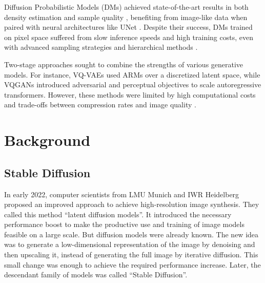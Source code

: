 \documentclass[11pt]{article}
\begin{document}
Diffusion Probabilistic Models (DMs) \cite{sohldickstein2015deepunsupervisedlearningusing} achieved state-of-the-art results in both density estimation \cite{kingma2023variationaldiffusionmodels} and sample quality \cite{dhariwal2021diffusionmodelsbeatgans}, benefiting from image-like data when paired with neural architectures like UNet \cite{dhariwal2021diffusionmodelsbeatgans, ronneberger2015unetconvolutionalnetworksbiomedical, DBLP:journals/corr/abs-2011-13456}. Despite their success, DMs trained on pixel space suffered from slow inference speeds and high training costs, even with advanced sampling strategies and hierarchical methods \cite{DBLP:journals/corr/abs-2106-15282, DBLP:journals/corr/abs-2106-00132, DBLP:journals/corr/abs-2104-02600, DBLP:conf/iclr/SongME21, DBLP:journals/corr/abs-2106-05931}.

Two-stage approaches \cite{DBLP:conf/iclr/DaiW19, esser2021tamingtransformershighresolutionimage, DBLP:conf/nips/RazaviOV19, DBLP:conf/nips/RombachEO20, DBLP:journals/corr/abs-2104-10157, yu2021vectorquantized} sought to combine the strengths of various generative models. For instance, VQ-VAEs \cite{DBLP:conf/nips/RazaviOV19, DBLP:journals/corr/abs-2104-10157} used ARMs over a discretized latent space, while VQGANs \cite{esser2021tamingtransformershighresolutionimage, yu2021vectorquantized} introduced adversarial and perceptual objectives to scale autoregressive transformers. However, these methods were limited by high computational costs and trade-offs between compression rates and image quality \cite{esser2021tamingtransformershighresolutionimage, ramesh2021zeroshottexttoimagegeneration}.





\pagebreak
\section{Background}
\subsection{Stable Diffusion}
\label{heading:subsection:stable_diffusion}
In early 2022, computer scientists from LMU Munich and IWR Heidelberg proposed an improved approach to achieve high-resolution image synthesis\cite{rombach2022stablediffusion}. They called this method ``latent diffusion models''. It introduced the necessary performance boost to make the productive use and training of image models feasible on a large scale. But diffusion models were already known. The new idea was to generate a low-dimensional representation of the image by denoising and then upscaling it, instead of generating the full image by iterative diffusion. This small change was enough to achieve the required performance increase. Later, the descendant family of models was called ``Stable Diffusion''.
\end{document}
